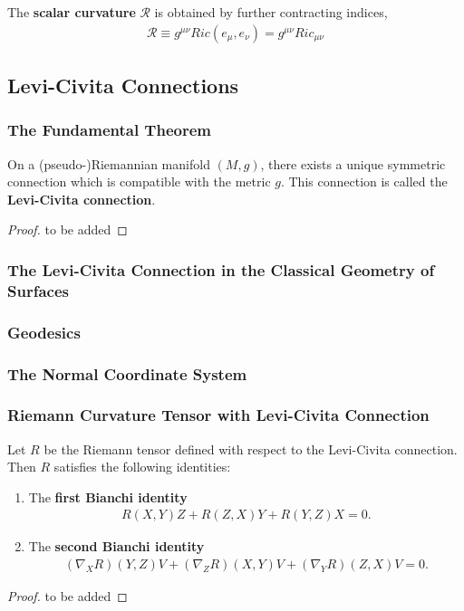 \documentclass[10pt]{article}
\begin{document}
\begin{definition}
    The \textbf{scalar curvature} $\mathcal{R}$ is obtained by further contracting indices,
    \begin{align}
        \mathcal{R}\equiv g^{\mu\nu}Ric(e_\mu,e_\nu)=g^{\mu\nu}Ric_{\mu\nu}
    \end{align}
\end{definition}
\subsection{Levi-Civita Connections}
\subsubsection{The Fundamental Theorem}
\begin{theorem}
    On a (pseudo-)Riemannian manifold $(M,g)$, there exists a unique symmetric connection which is compatible with the metric $g$.
    This connection is called the \textbf{Levi-Civita connection}.
\end{theorem}
\begin{proof}
    to be added
\end{proof}
\subsubsection{The Levi-Civita Connection in the Classical Geometry of Surfaces}
\subsubsection{Geodesics}
\subsubsection{The Normal Coordinate System\label{normalcoordinates}}
\subsubsection{Riemann Curvature Tensor with Levi-Civita Connection}
\begin{theorem}
    Let $R$ be the Riemann tensor defined with respect to the Levi-Civita connection.
    Then $R$ satisfies the following identities:
    \begin{enumerate}
        \item The \textbf{first Bianchi identity}
              \begin{align}
                  R(X,Y)Z+R(Z,X)Y+R(Y,Z)X=0.\label{bianchi1}
              \end{align}
        \item The \textbf{second Bianchi identity}
              \begin{align}
                  (\nabla_X R)(Y,Z)V+(\nabla_Z R)(X,Y)V+(\nabla_Y R)(Z,X)V=0.\label{bianchi2}
              \end{align}
    \end{enumerate}
\end{theorem}
\begin{proof}
    to be added
\end{proof}
\end{document}
